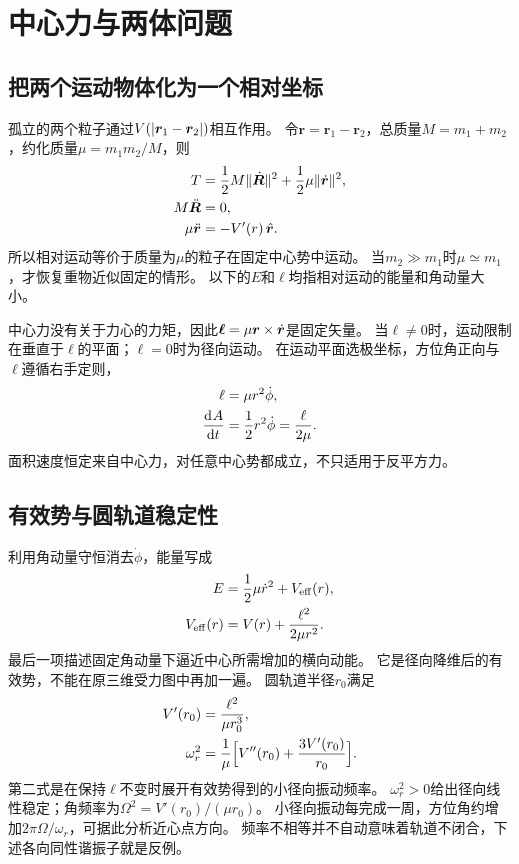 \chapter{中心力与两体问题}

\section{把两个运动物体化为一个相对坐标}
孤立的两个粒子通过$V(\lvert\bm r_1 - \bm r_2\rvert)$相互作用。
令$\bm r = \bm r_1 - \bm r_2$，总质量$M = m_1 + m_2$，约化质量$\mu = m_1m_2/M$，则
\begin{subequations}
 \begin{align}
  T &= \frac12M\lVert\dot{\bm{R}}\rVert^2 + \frac12\mu\lVert\dot{\bm{r}}\rVert^2,\\
  M\ddot{\bm R} &= 0,\\
  \mu\ddot{\bm r} &= -V'(r)\mathop{}\!\hat{\bm{r}}.
 \end{align}
\end{subequations}
所以相对运动等价于质量为$\mu$的粒子在固定中心势中运动。
当$m_2 \gg m_1$时$\mu \simeq m_1$，才恢复重物近似固定的情形。
以下的$E$和$\ell$均指相对运动的能量和角动量大小。

中心力没有关于力心的力矩，因此$\bm\ell = \mu\bm r \times \dot{\bm{r}}$是固定矢量。
当$\ell \ne 0$时，运动限制在垂直于$\bm\ell$的平面；$\ell = 0$时为径向运动。
在运动平面选极坐标，方位角正向与$\bm\ell$遵循右手定则，
\begin{subequations}
 \begin{align}
  \ell &= \mu r^2\dot\phi,\\
  \frac{\mathop{}\!\mathrm{d}^{}A}{\mathrm{d}{t}^{}} &= \frac12r^2\dot\phi = \frac\ell{2\mu}. \label{eq:cm-area}
 \end{align}
\end{subequations}
面积速度恒定来自中心力，对任意中心势都成立，不只适用于反平方力。

\section{有效势与圆轨道稳定性}
利用角动量守恒消去$\dot\phi$，能量写成
\begin{subequations}\label{eq:cm-effective}
 \begin{align}
  E &= \frac12\mu\dot r^2 + V_{\mathrm{eff}}(r),\\
  V_{\mathrm{eff}}(r) &= V(r) + \frac{\ell^2}{2\mu r^2}.
 \end{align}
\end{subequations}
最后一项描述固定角动量下逼近中心所需增加的横向动能。
它是径向降维后的有效势，不能在原三维受力图中再加一遍。
圆轨道半径$r_0$满足
\begin{subequations}
 \begin{align}
  V'(r_0) &= \frac{\ell^2}{\mu r_0^3},\\
  \omega_r^2 &= \frac1\mu\Bigl[V''(r_0) + \frac{3V'(r_0)}{r_0}\Bigr].
 \end{align}
\end{subequations}
第二式是在保持$\ell$不变时展开有效势得到的小径向振动频率。
$\omega_r^2 > 0$给出径向线性稳定；角频率为$\Omega^2 = V'(r_0)/(\mu r_0)$。
小径向振动每完成一周，方位角约增加$2\pi\Omega/\omega_r$，可据此分析近心点方向。
频率不相等并不自动意味着轨道不闭合，下述各向同性谐振子就是反例。

